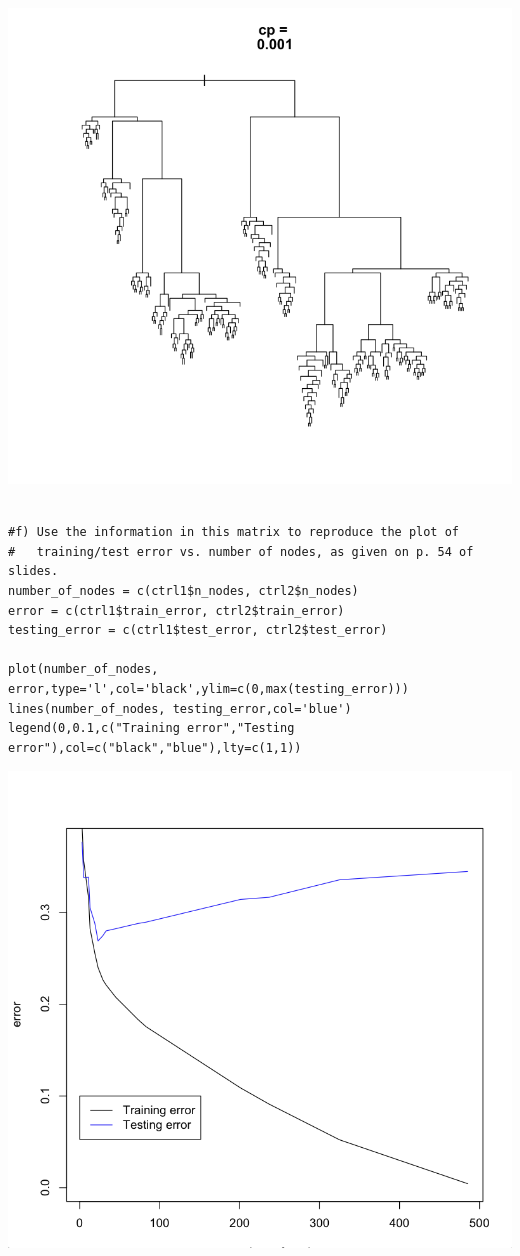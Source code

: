 \documentclass[11pt]{article}
\begin{document}
\begin{center}
\includegraphics[scale=0.25]{images/ctrl11}
\end{center}

\begin{Verbatim}

#f) Use the information in this matrix to reproduce the plot of 
#   training/test error vs. number of nodes, as given on p. 54 of slides.
number_of_nodes = c(ctrl1$n_nodes, ctrl2$n_nodes)
error = c(ctrl1$train_error, ctrl2$train_error)
testing_error = c(ctrl1$test_error, ctrl2$test_error)

plot(number_of_nodes, error,type='l',col='black',ylim=c(0,max(testing_error)))
lines(number_of_nodes, testing_error,col='blue')
legend(0,0.1,c("Training error","Testing error"),col=c("black","blue"),lty=c(1,1))
\end{Verbatim}

\begin{center}
\includegraphics[scale=0.35]{images/trainvstest}
\end{center}
\end{document}
